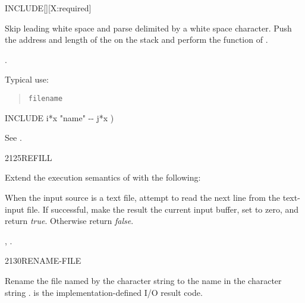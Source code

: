 \begin{worddef}{}{INCLUDE}[][X:required]
\item {}

	Skip leading white space and parse  delimited by a
	white space character. Push the address and length of the
	 on the stack and perform the function of
	.

\see {}.

	\begin{defer}
	\rationale
		Typical use:
		\begin{quote}
			 \texttt{filename}
		\end{quote}

	\implementation
		\word{:} INCLUDE  i*x "name" -{}- j*x ) \\
		\tab {}  \word{;}

	\testing*
		See .
	\end{defer}
\end{worddef}


\begin{worddef}{2125}{REFILL}
\item {}

	Extend the execution semantics of 
	with the following:

	When the input source is a text file, attempt to read the next
	line from the text-input file. If successful, make the result
	the current input buffer, set  to zero, and
	return \emph{true}. Otherwise return \emph{false}.

\see {},
	.
\end{worddef}


\begin{worddef}{2130}{RENAME-FILE}
\item {}

	Rename the file named by the character string 
	to the name in the character string .
	 is the implementation-defined I/O result code.
\end{worddef}


